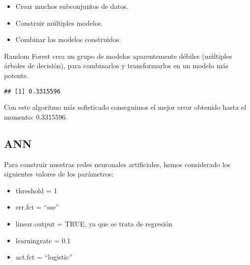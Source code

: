 \documentclass[
]{article}
\newenvironment{Shaded}{\begin{snugshade}}{\end{snugshade}}
\newcommand{\DataTypeTok}[1]{\textcolor[rgb]{0.13,0.29,0.53}{#1}}
\newcommand{\DecValTok}[1]{\textcolor[rgb]{0.00,0.00,0.81}{#1}}
\newcommand{\KeywordTok}[1]{\textcolor[rgb]{0.13,0.29,0.53}{\textbf{#1}}}
\newcommand{\NormalTok}[1]{#1}
\newcommand{\OperatorTok}[1]{\textcolor[rgb]{0.81,0.36,0.00}{\textbf{#1}}}
\newcommand{\StringTok}[1]{\textcolor[rgb]{0.31,0.60,0.02}{#1}}
\providecommand{\tightlist}{%
  \setlength{\itemsep}{0pt}\setlength{\parskip}{0pt}}
\begin{document}
\begin{itemize}
\tightlist
\item
  Crear muchos subconjuntos de datos.
\item
  Construir múltiples modelos.
\item
  Combinar los modelos construidos.
\end{itemize}

Random Forest crea un grupo de modelos aparentemente débiles (múltiples
árboles de decisión), para combinarlos y transformarlos en un modelo más
potente.

\begin{Shaded}
\end{Shaded}

\begin{verbatim}
## [1] 0.3315596
\end{verbatim}

Con este algoritmo más sofisticado conseguimos el mejor error obtenido
hasta el momento: 0.3315596.

\hypertarget{ann}{%
\subsection{ANN}\label{ann}}

Para construir nuestras redes neuronales artificiales, hemos considerado
los siguientes valores de los parámetros:

\begin{itemize}
\item
  threshold = 1
\item
  err.fct = ``sse''
\item
  linear.output = TRUE, ya que se trata de regresión
\item
  learningrate = 0.1
\item
  act.fct = ``logistic''
\end{itemize}
\end{document}
